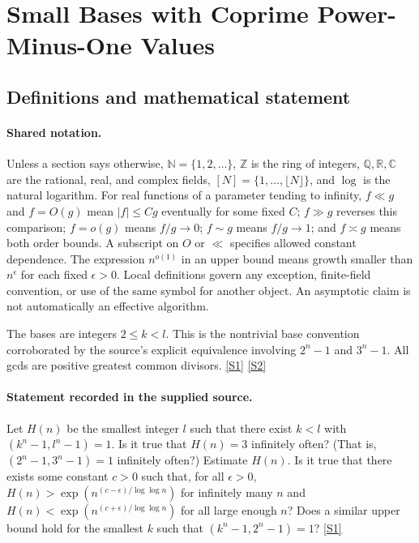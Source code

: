 \documentclass[11pt,a4paper]{article}
\newcommand{\N}{\mathbb{N}}
\newcommand{\Z}{\mathbb{Z}}
\newcommand{\Q}{\mathbb{Q}}
\newcommand{\R}{\mathbb{R}}
\newcommand{\C}{\mathbb{C}}
\newcommand{\sref}[2]{\hyperlink{source:#1:#2}{[S#2]}}
\begin{document}
\section{Small Bases with Coprime Power-Minus-One Values}\label{statement}


\subsection{Definitions and mathematical statement}

\paragraph{Shared notation.}Unless a section says otherwise, $\N=\{1,2,\ldots\}$,
$\Z$ is the ring of integers, $\Q,\R,\C$ are the rational, real, and complex
fields, $[N]=\{1,\ldots,\lfloor N\rfloor\}$, and $\log$ is the natural
logarithm. For real functions of a parameter tending to infinity,
$f\ll g$ and $f=O(g)$ mean $|f|\leq Cg$ eventually for some fixed $C$;
$f\gg g$ reverses this comparison; $f=o(g)$ means $f/g\to0$;
$f\sim g$ means $f/g\to1$; and $f\asymp g$ means both order bounds.
A subscript on $O$ or $\ll$ specifies allowed constant dependence.
The expression $n^{o(1)}$ in an upper bound means growth smaller than
$n^\epsilon$ for each fixed $\epsilon>0$. Local definitions govern any
exception, finite-field convention, or use of the same symbol for another
object. An asymptotic claim is not automatically an effective algorithm.



The bases are integers $2\leq k<l$. This is the nontrivial base convention corroborated by the source's explicit equivalence involving $2^n-1$ and $3^n-1$. All gcds are positive greatest common divisors. \sref{statement}{1} \sref{statement}{2}

\paragraph{Statement recorded in the supplied source.}
Let $H(n)$ be the smallest integer $l$ such that there exist $k<l$ with $(k^n-1,l^n-1)=1$.
Is it true that $H(n)=3$ infinitely often? (That is, $(2^n-1,3^n-1)=1$ infinitely often?)
Estimate $H(n)$. Is it true that there exists some constant $c>0$ such that, for all $\epsilon>0$, $ H(n) > \exp(n^{(c-\epsilon)/\log\log n}) $ for infinitely many $n$ and $ H(n) < \exp(n^{(c+\epsilon)/\log\log n}) $ for all large enough $n$?
Does a similar upper bound hold for the smallest $k$ such that $(k^n-1,2^n-1)=1$? \sref{statement}{1}
\end{document}
